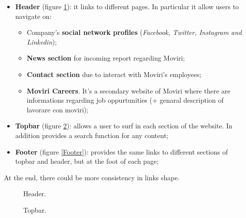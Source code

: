 \begin{itemize}
\item \textbf{Header} (figure \ref{Header}): it links to different pages. In particular it allow users to navigate on:
\begin{itemize}
\item Company's \textbf{social network profiles} (\textit{Facebook, Twitter, Instagram and Linkedin});
\item \textbf{News section} for incoming report regarding Moviri;
\item \textbf{Contact section} due to interact with Moviri's employees;
\item \textbf{Moviri Careers}. It's a secondary website of Moviri where there are informations regarding job oppurtunities (+ genaral description of lavorare con moviri);
\end{itemize}
\item \textbf{Topbar} (figure \ref{topbar}): allows a user to surf in each section of the website. In addition provides a search function for any content; 
\item \textbf{Footer} (figure \ref{Footer}): provides the same links to different sections of topbar and header, but at the foot of each page;
\end{itemize}
At the end, there could be more consistency in links shape.	


\begin{figure}[H]
  \centering
  \caption{Header.}
   \label{Header}
\end{figure}

\begin{figure}[H]
  \centering
  \caption{Topbar.}
   \label{topbar}
\end{figure}


